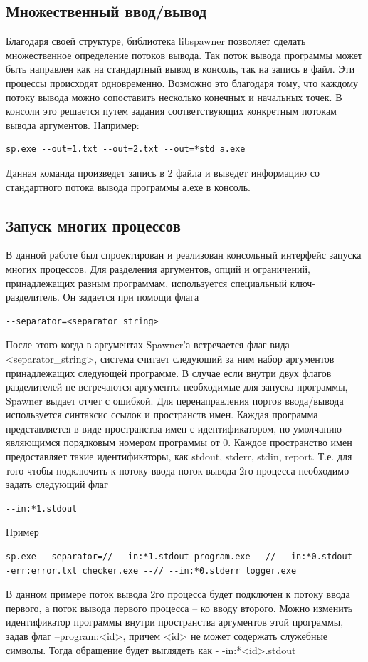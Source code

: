 \documentclass{imcs}
\begin{document}
\subsection{Множественный ввод/вывод}
Благодаря своей структуре, библиотека libspawner позволяет сделать множественное определение потоков вывода. Так поток вывода программы может быть направлен как на стандартный вывод в консоль, так на запись в файл. Эти процессы происходят одновременно. Возможно это благодаря тому, что каждому потоку вывода можно сопоставить несколько конечных и начальных точек.
В консоли это решается путем задания соответствующих конкретным потокам вывода аргументов.
Например:
\begin{lstlisting}
sp.exe --out=1.txt --out=2.txt --out=*std a.exe
\end{lstlisting}
Данная команда произведет запись в 2 файла и выведет информацию со стандартного потока вывода программы а.ехе в консоль.
\subsection{Запуск многих процессов}
В данной работе был спроектирован и реализован консольный интерфейс запуска многих процессов.
Для разделения аргументов, опций и ограничений, принадлежащих разным программам, используется специальный ключ-разделитель. Он задается при помощи флага 
\begin{lstlisting}
--separator=<separator_string>
\end{lstlisting}
После этого когда в аргументах Spawner’а встречается флаг вида - -<separator\_string>, система считает следующий за ним набор аргументов принадлежащих следующей программе. В случае если внутри двух флагов разделителей не встречаются аргументы необходимые для запуска программы, Spawner выдает отчет с ошибкой.
Для перенаправления портов ввода/вывода используется синтаксис ссылок и пространств имен. Каждая программа представляется в виде пространства имен с идентификатором, по умолчанию являющимся порядковым номером программы от 0. Каждое пространство имен предоставляет такие идентификаторы, как stdout, stderr, stdin, report. Т.е. для того чтобы подключить к потоку ввода поток вывода 2го процесса необходимо задать следующий флаг
\begin{lstlisting}
--in:*1.stdout
\end{lstlisting}

Пример
\begin{lstlisting}
sp.exe --separator=// --in:*1.stdout program.exe --// --in:*0.stdout --err:error.txt checker.exe --// --in:*0.stderr logger.exe
\end{lstlisting}
В данном примере поток вывода 2го процесса будет подключен к потоку ввода первого, а поток вывода первого процесса – ко вводу второго.
Можно изменить идентификатор программы внутри пространства аргументов этой программы, задав флаг –program:<id>, причем <id> не может содержать служебные символы. Тогда обращение будет выглядеть как - -in:*<id>.stdout
\end{document}

